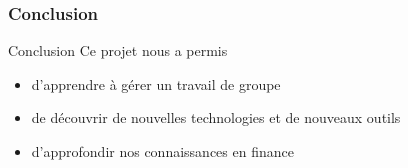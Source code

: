 \begin{frame}
    \frametitle{Conclusion}
    \begin{block}{Conclusion}
    		Ce projet nous a permis 
    	\begin{itemize}
    		\item d'apprendre à gérer un travail de groupe
    		\item de découvrir de nouvelles technologies et de nouveaux outils
    		\item d’approfondir nos connaissances en finance
    	\end{itemize}
    \end{block}
\end{frame}
